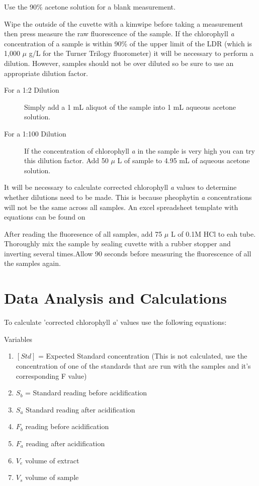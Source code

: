 \documentclass[12pt]{../SOP3}\usepackage[]{graphicx}\usepackage[]{color}
\begin{document}
\NP Use the 90\% acetone solution for a blank measurement.


\NP Wipe the outside of the cuvette with a kimwipe before taking a measurement then press measure the raw fluorescence of the sample. If the chlorophyll \textit{a} concentration of a sample is within 90\% of the upper limit of the LDR (which is 1,000 $\mu$ g/L for the Turner Trilogy fluorometer) it will be necessary to perform a dilution. However, samples should not be over diluted so be sure to use an appropriate dilution factor. 

\begin{description} 
\item[For a 1:2 Dilution] Simply add a 1 mL aliquot of the sample into 1 mL aqueous acetone solution.
\item[For a 1:100 Dilution] If the concentration of chlorophyll \textit{a} in the sample is very high you can try this dilution factor. Add 50 $\mu$ L of sample to 4.95 mL of aqueous acetone solution. 
\end{description}

\NP It will be necessary to calculate corrected chlorophyll \textit{a} values to determine whether dilutions need to be made. This is because pheophytin \textit{a} concentrations will not be the same across all samples. An excel spreadsheet template with equations can be found on %

\NP After reading the fluoresence of all samples, add 75 $\mu$ L of  0.1M HCl to eah tube. Thoroughly mix the sample by sealing cuvette with a rubber stopper and inverting several times.Allow 90 seconds before measuring the fluorescence of all the samples again. 

\section{Data Analysis and Calculations}
To calculate 'corrected chlorophyll \textit{a}' values use the following equations: %

\NP Variables
\begin{enumerate}
\item $[Std]$ = Expected Standard concentration (This is not calculated, use the concentration of one of the standards that are run with the samples and it's corresponding F value)
\item $S_b$ = Standard reading before acidification
\item $S_a$ Standard reading after acidification
\item $F_b$ reading before acidification
\item $F_a$ reading after acidification
\item $V_e$ volume of extract
\item $V_s$ volume of sample 
\end{enumerate}
\end{document}
